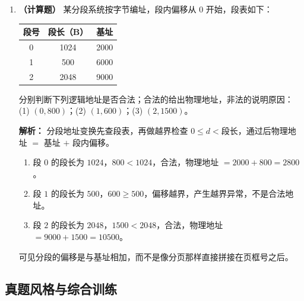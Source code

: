 \begin{enumerate}
\ifshowsolutions\par\noindent\textbf{解析：} 抖动的本质是缺页过于频繁，进程大部分时间在等待换入换出，CPU 利用率随之下降。其常见原因是分配给进程的页框数小于它当前工作集所需。增加并发进程数会进一步摊薄每个进程的页框，使抖动加剧，(A) 错误。工作集 $W(t,\Delta)$ 是区间 $[t-\Delta,t]$ 内访问过的页面集合，窗口越大，纳入的历史访问越多，集合只会扩大或不变，不会必然变小，(C) 错误。全局置换允许进程互相抢占页框，可能把别的进程正在使用的页换出，反而加剧抖动，(D) 错误。当所有进程工作集之和超过物理页框总数时，至少有一部分进程无法获得足够页框，系统进入频繁换页状态，(B) 正确。\else \answerarea \fi

\item \textbf{（计算题）} 某分段系统按字节编址，段内偏移从 $0$ 开始，段表如下：
\begin{center}
\begin{tabular}{|c|c|c|}
\hline
段号 & 段长（B） & 基址 \\
\hline
0 & 1024 & 2000 \\
1 & 500 & 6000 \\
2 & 2048 & 9000 \\
\hline
\end{tabular}
\end{center}
分别判断下列逻辑地址是否合法；合法的给出物理地址，非法的说明原因：
(1) $(0,800)$；(2) $(1,600)$；(3) $(2,1500)$。

\ifshowsolutions\par\noindent\textbf{解析：} 分段地址变换先查段表，再做越界检查 $0\le d<\text{段长}$，通过后物理地址 $=$ 基址 $+$ 段内偏移。
\begin{enumerate}[label=(\arabic*)]
\item 段 $0$ 的段长为 $1024$，$800<1024$，合法，物理地址 $=2000+800=2800$。
\item 段 $1$ 的段长为 $500$，$600\ge500$，偏移越界，产生越界异常，不是合法地址。
\item 段 $2$ 的段长为 $2048$，$1500<2048$，合法，物理地址 $=9000+1500=10500$。
\end{enumerate}
可见分段的偏移是与基址相加，而不是像分页那样直接拼接在页框号之后。\par\noindent{}\else \answerarea \fi

\end{enumerate}

\subsection{真题风格与综合训练}

